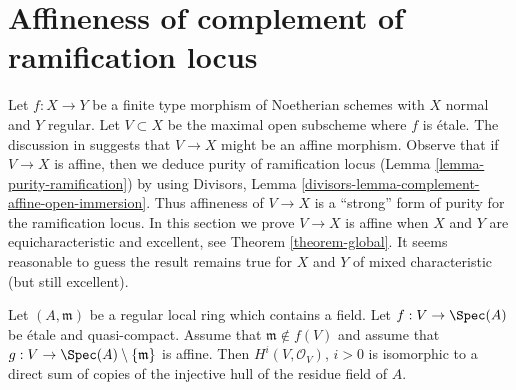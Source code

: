 \section{Affineness of complement of ramification locus}
\label{section-stronger-purity}

\noindent
Let $f : X \to Y$ be a finite type morphism of Noetherian schemes
with $X$ normal and $Y$ regular. Let $V \subset X$ be the maximal
open subscheme where $f$ is \'etale.
The discussion in \cite[Chapter IV, Section 21.12]{EGA}
suggests that $V \to X$ might be an affine morphism.
Observe that if $V \to X$ is affine, then we deduce purity of
ramification locus (Lemma \ref{lemma-purity-ramification}) by
using Divisors, Lemma \ref{divisors-lemma-complement-affine-open-immersion}.
Thus affineness of $V \to X$ is a ``strong'' form of purity
for the ramification locus.
In this section we prove $V \to X$ is affine when
$X$ and $Y$ are equicharacteristic and excellent, see
Theorem \ref{theorem-global}. It seems reasonable
to guess the result remains true for $X$ and $Y$
of mixed characteristic (but still excellent).

\begin{lemma}
\label{lemma-structure-cohomology}
Let $(A, \mathfrak m)$ be a regular local ring which contains a field.
Let $f : V \to \Spec(A)$ be \'etale and quasi-compact.
Assume that $\mathfrak m \not \in f(V)$ and assume that
$g : V \to \Spec(A) \setminus \{\mathfrak m\}$ is affine.
Then $H^i(V, \mathcal{O}_V)$, $i > 0$ is isomorphic to a direct
sum of copies of the injective hull of the residue field of $A$.
\end{lemma}

